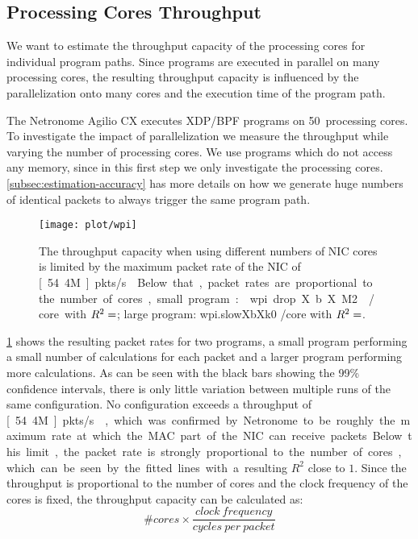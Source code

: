 \documentclass[10pt,letterpaper,sigconf,anonymous,nonacm,screen]{acmart}
\newcommand{\afblock}[1]{\noindent{\textbf{#1.}}}
\newcommand{\mdata}[3]{%
	\csname #1X#2X#3\endcsname%
}
\newcommand{\maclimit}[0]{%
	\unit[54.4M]{pkts/s}%
}
\begin{document}
\subsection{Processing Cores Throughput}
\label{subsec:processing-bottleneck}

We want to estimate the throughput capacity of the processing cores for individual program paths.
Since programs are executed in parallel on many processing cores, the resulting throughput capacity is influenced by the parallelization onto many cores and the execution time of the program path.


\afblock{Many-Core Parallelization}
The Netronome Agilio CX executes XDP/BPF programs on 50~processing cores.
To investigate the impact of parallelization we measure the throughput while varying the number of processing cores.
We use programs which do not access any memory, since in this first step we only investigate the processing cores.
\ref{subsec:estimation-accuracy} has more details on how we generate huge numbers of identical packets to always trigger the same program path.

\begin{figure}[t]
	\texttt{[image: plot/wpi]}

	\caption{The throughput capacity when using different numbers of NIC cores is limited by the maximum packet rate of the NIC of \maclimit{}.
	Below that, packet rates are proportional to the number of cores, small program: \mdata{wpi.drop}{b}{M2}/core with $R^2 = \mdata{wpi.drop}{Rsquared}{6}$; large program: \mdata{wpi.slow}{b}{k0}/core with $R^2 = \mdata{wpi.slow}{Rsquared}{6}$.
	}
	\label{fig:wpi}
\end{figure}

\ref{fig:wpi} shows the resulting packet rates for two programs, a small program performing a small number of calculations for each packet and a larger program performing more calculations.
As can be seen with the black bars showing the 99\% confidence intervals, there is only little variation between multiple runs of the same configuration.
No configuration exceeds a throughput of \maclimit{}, which was confirmed by Netronome to be roughly the maximum rate at which the MAC part of the NIC can receive packets.
Below this limit, the packet rate is strongly proportional to the number of cores, which can be seen by the fitted lines with a resulting $R^2$ close to $1$.
Since the throughput is proportional to the number of cores and the clock frequency of the cores is fixed, the throughput capacity can be calculated as: \[\#cores \times \frac{clock~frequency}{cycles~per~packet}\]
\end{document}
